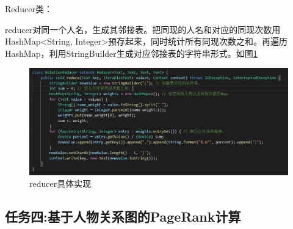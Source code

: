 \documentclass[a4paper,UTF8]{article}
\numberwithin{equation}{section}
\begin{document}
\par Reducer类：
\par reducer对同一个人名，生成其邻接表。把同现的人名和对应的同现次数用HashMap<String, Integer>预存起来，同时统计所有同现次数之和。再遍历HashMap，利用StringBuilder生成对应邻接表的字符串形式。如图\ref{task3-reducer}
\begin{figure}[htbp]
	\centering
	\includegraphics[width = 15cm]{task3-reducer.png}
	\caption{reducer具体实现}
	\label{task3-reducer}
\end{figure}

\subsection{任务四:基于人物关系图的PageRank计算}
\end{document}
